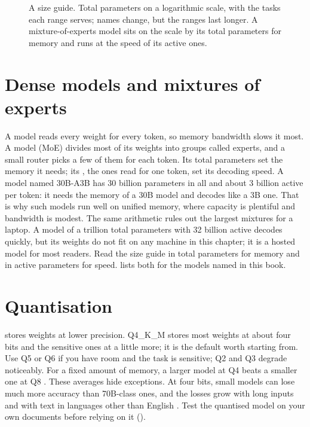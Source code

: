 \begin{figure}[htbp]
\centering
{}
\caption{A size guide. Total parameters on a logarithmic scale, with the tasks
each range serves; names change, but the ranges last longer. A mixture-of-experts
model sits on the scale by its total parameters for memory and runs at the
speed of its active ones.}
\label{fig:sizes}
\end{figure}

\section{Dense models and mixtures of experts}

A  model reads every weight for every token, so memory bandwidth
slows it most. A  model (MoE) divides most of its
weights into groups called experts, and a small router picks a few of them for
each token. Its total parameters set the memory it needs; its , the ones read for one token, set its decoding speed. A model
named 30B-A3B has 30 billion parameters in all and about 3 billion active per
token: it needs the memory of a 30B model and decodes like a 3B one. That is
why such models run well on unified memory, where capacity is plentiful and
bandwidth is modest. The same arithmetic rules out the largest mixtures for a
laptop. A model of a trillion total parameters with 32 billion active decodes
quickly, but its weights do not fit on any machine in this chapter; it is a
hosted model for most readers. Read the size guide in total parameters for
memory and in active parameters for speed.  lists both
for the models named in this book.

\section{Quantisation}

 stores weights at lower precision. Q4\_K\_M stores most
weights at about four bits and the sensitive ones at a little more; it is the
default worth starting from. Use Q5 or Q6 if you have room and the task is
sensitive; Q2 and Q3 degrade noticeably. For a fixed amount of memory, a
larger model at Q4 beats a smaller one at Q8 \parencite{dettmers2022fourbit}.
These averages hide exceptions. At four bits, small models can lose much more
accuracy than 70B-class ones, and the losses grow with long inputs and with
text in languages other than English
\parencite{lee2025quantisation,mekala2025quantlong}. Test the quantised model on
your own documents before relying on it ().

